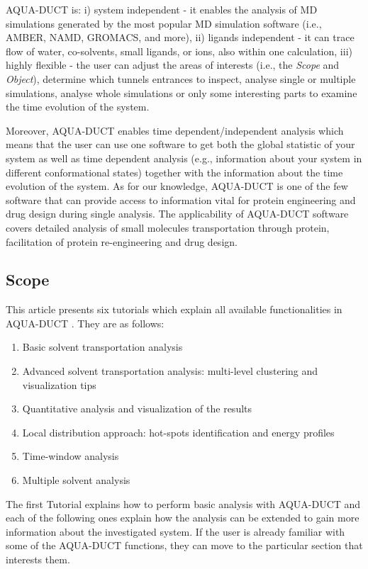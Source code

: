 \documentclass[9pt,tutorial]{livecoms}
\begin{document}
AQUA-DUCT is:
\newline
i) system independent - it enables the analysis of MD simulations generated by the most popular MD simulation software (i.e., AMBER, NAMD, GROMACS, and more), 
\newline
ii) ligands independent - it can trace flow of water, co-solvents, small ligands, or ions, also within one calculation, 
\newline
iii) highly flexible - the user can adjust the areas of interests (i.e., the \emph{Scope} and \emph{Object}), determine which tunnels entrances to inspect, analyse single or multiple simulations, analyse whole simulations or only some interesting parts to examine the time evolution of the system. 

Moreover, AQUA-DUCT enables time dependent/independent analysis which means that the user can use one software to get both the global statistic of your system as well as time dependent analysis (e.g., information about your system in different conformational states) together with the information about the time evolution of the system. As for our knowledge, AQUA-DUCT is one of the few software that can provide access to information vital for protein engineering and drug design during single analysis. The applicability of AQUA-DUCT software covers detailed analysis of small molecules transportation through protein, facilitation of protein re-engineering and drug design. 

\subsection{Scope}

This article presents six tutorials which explain all available functionalities in AQUA-DUCT \cite{Magdziarz2020}. They are as follows:
\begin{enumerate}
\item Basic solvent transportation analysis
\item Advanced solvent transportation analysis: multi-level clustering and visualization tips
\item Quantitative analysis and visualization of the results
\item Local distribution approach: hot-spots identification and energy profiles
\item Time-window analysis
\item Multiple solvent analysis
\end{enumerate}

The first Tutorial explains how to perform basic analysis with AQUA-DUCT and each of the following ones explain how the analysis can be extended to gain more information about the investigated system. If the user is already familiar with some of the AQUA-DUCT functions, they can move to the particular section that interests them. 
\end{document}
